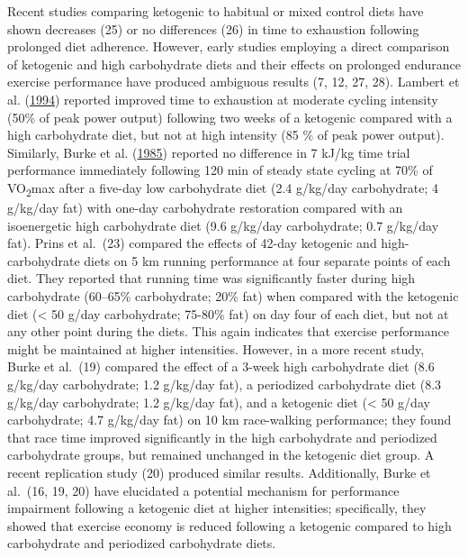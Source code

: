 \documentclass[]{cik}%
\begin{document}
Recent studies comparing ketogenic to habitual or mixed control diets
have shown decreases (25) or no differences (26) in time to exhaustion
following prolonged diet adherence. However, early studies employing a
direct comparison of ketogenic and high carbohydrate diets and their
effects on prolonged endurance exercise performance have produced
ambiguous results (7, 12, 27, 28). Lambert et al.
(\protect\hyperlink{ref-7}{1994}) reported improved time to exhaustion
at moderate cycling intensity (50\% of peak power output) following two
weeks of a ketogenic compared with a high carbohydrate diet, but not at
high intensity (85 \% of peak power output). Similarly, Burke et al.
(\protect\hyperlink{ref-18}{1985}) reported no difference in 7 kJ/kg
time trial performance immediately following 120 min of steady state
cycling at 70\% of VO\textsubscript{2}max after a five-day low
carbohydrate diet (2.4 g/kg/day carbohydrate; 4 g/kg/day fat) with
one-day carbohydrate restoration compared with an isoenergetic high
carbohydrate diet (9.6 g/kg/day carbohydrate; 0.7 g/kg/day fat). Prins
et al.~(23) compared the effects of 42-day ketogenic and
high-carbohydrate diets on 5 km running performance at four separate
points of each diet. They reported that running time was significantly
faster during high carbohydrate (60--65\% carbohydrate; 20\% fat) when
compared with the ketogenic diet (\textless{} 50 g/day carbohydrate;
75-80\% fat) on day four of each diet, but not at any other point during
the diets. This again indicates that exercise performance might be
maintained at higher intensities. However, in a more recent study, Burke
et al.~(19) compared the effect of a 3-week high carbohydrate diet (8.6
g/kg/day carbohydrate; 1.2 g/kg/day fat), a periodized carbohydrate diet
(8.3 g/kg/day carbohydrate; 1.2 g/kg/day fat), and a ketogenic diet
(\textless{} 50 g/day carbohydrate; 4.7 g/kg/day fat) on 10 km
race-walking performance; they found that race time improved
significantly in the high carbohydrate and periodized carbohydrate
groups, but remained unchanged in the ketogenic diet group. A recent
replication study (20) produced similar results. Additionally, Burke et
al.~(16, 19, 20) have elucidated a potential mechanism for performance
impairment following a ketogenic diet at higher intensities;
specifically, they showed that exercise economy is reduced following a
ketogenic compared to high carbohydrate and periodized carbohydrate
diets.
\end{document}
